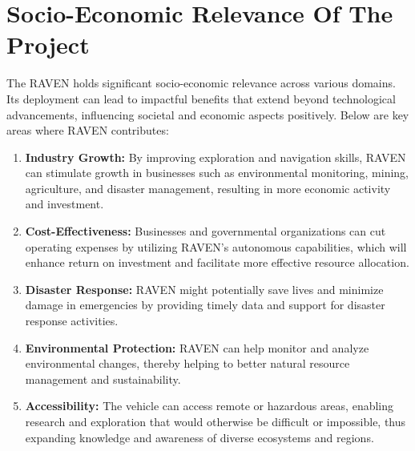 \section{\fontsize{14}{16} Socio-Economic Relevance Of The Project} \label{sec:sec1}
{
	\fontsize{12}{14}
	The RAVEN holds significant socio-economic relevance across various domains. Its deployment can lead to impactful benefits that extend beyond technological advancements, influencing societal and economic aspects positively. Below are key areas where RAVEN contributes:
	\begin{enumerate}[label=\textbf{\arabic*}.]
		\item \textbf{Industry Growth:} By improving exploration and navigation skills, RAVEN can
		stimulate growth in businesses such as environmental monitoring, mining, agriculture,
		and disaster management, resulting in more economic activity and investment.
			
		\item \textbf{Cost-Effectiveness:} Businesses and governmental organizations can cut operating
		expenses by utilizing RAVEN's autonomous capabilities, which will enhance return on
		investment and facilitate more effective resource allocation.
					
		\item \textbf{Disaster Response:} RAVEN might potentially save lives and minimize damage in
		emergencies by providing timely data and support for disaster response activities.
			
		\item \textbf{Environmental Protection:} RAVEN can help monitor and analyze environmental
		changes, thereby helping to better natural resource management and sustainability.
			
		\item \textbf{Accessibility:} The vehicle can access remote or hazardous areas, enabling research and
		exploration that would otherwise be difficult or impossible, thus expanding knowledge
		and awareness of diverse ecosystems and regions.
	\end{enumerate}
}

